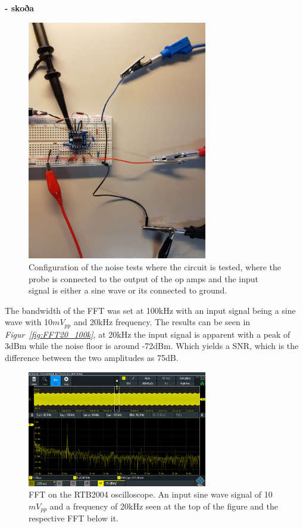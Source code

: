 \textbf{%
- skoða} 

\begin{figure}[h]
    \centering
    \includegraphics[width=0.7\textwidth]{graphics/TESTINGwSineinp.jpg}
    \caption{Configuration of the noise tests where the circuit is tested, where the probe is connected to the output of the op amps and the input signal is either a sine wave or its connected to ground.}
    \label{fig:SetupFFT}
\end{figure}

The bandwidth of the FFT was set at 100kHz with an input signal being a sine wave with 10$mV_{pp}$ and 20kHz frequency.
The results can be seen in \textit{Figur~\ref{fig:FFT20_100k}}, at 20kHz the input signal is apparent with a peak of 3dBm while the noise floor is around -72dBm.
Which yields a SNR, which is the difference between the two amplitudes as 75dB.

\begin{figure}[h]
    \centering
    \includegraphics[width=0.7\textwidth]{graphics/Noise20k10mVpp100kband.PNG}
    \caption{FFT on the RTB2004 oscilloscope. An input sine wave signal of 10$mV_{pp}$ and a frequency of 20kHz seen at the top of the figure and the respective FFT below it.}
    \label{fig:FFT20k_100k}
\end{figure}




